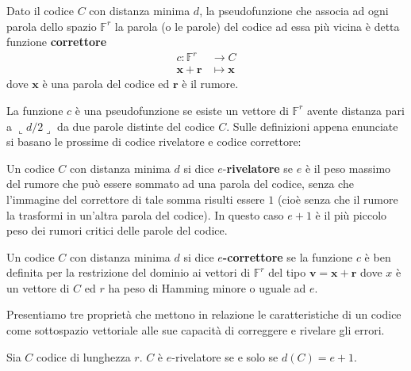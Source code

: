 \begin{definizione}
   Dato il codice $C$ con distanza minima $d$, la pseudofunzione che associa ad ogni parola dello spazio $\mathbb{F}^{r}$ la parola (o le parole) del codice ad essa più vicina è detta funzione {\bf correttore}
   \begin{align*}
       c: \mathbb{F}^{r}   &\longrightarrow  C \\
            \mathbf{x} + \mathbf{r} &\longmapsto  \mathbf{x}
   \end{align*}
   dove $\mathbf{x}$ è una parola del codice ed $\mathbf{r}$ è il rumore.
\end{definizione}
\noindent
La funzione $c$ è una pseudofunzione se esiste un vettore di $\mathbb{F}^{r}$ avente distanza pari a $\llcorner d/2 \lrcorner$ da due parole distinte del codice $C$. Sulle definizioni appena enunciate si basano le prossime di codice rivelatore e codice correttore:
\begin{definizione}
   Un codice $C$ con distanza minima $d$ si dice $e$-{\bf rivelatore} se $e$ è il peso massimo del rumore che può essere sommato ad una parola del codice, senza che l'immagine del correttore di tale somma risulti essere $1$ (cioè senza che il rumore la trasformi in un'altra parola del codice). In questo caso $e+1$ è il più piccolo peso dei rumori critici delle parole del codice.
\end{definizione}
\begin{definizione}
   Un codice $C$ con distanza minima $d$ si dice {\bf $e$-correttore} se la funzione $c$ è ben definita per la restrizione del dominio ai vettori di $\mathbb{F}^{r}$ del tipo $\mathbf{v} = \mathbf{x} + \mathbf{r}$ dove $x$ è un vettore di $C$ ed $r$ ha peso di Hamming minore o uguale ad $e$.
\end{definizione}
\noindent
Presentiamo tre proprietà che mettono in relazione le caratteristiche di un codice come sottospazio vettoriale alle sue capacità di correggere e rivelare gli errori.
\begin{prop} \label{cap2_1:propcodici1}
   Sia $C$ codice di lunghezza $r$. $C$ è $e$-rivelatore se e solo se $d(C)= e+1$.
\end{prop}
